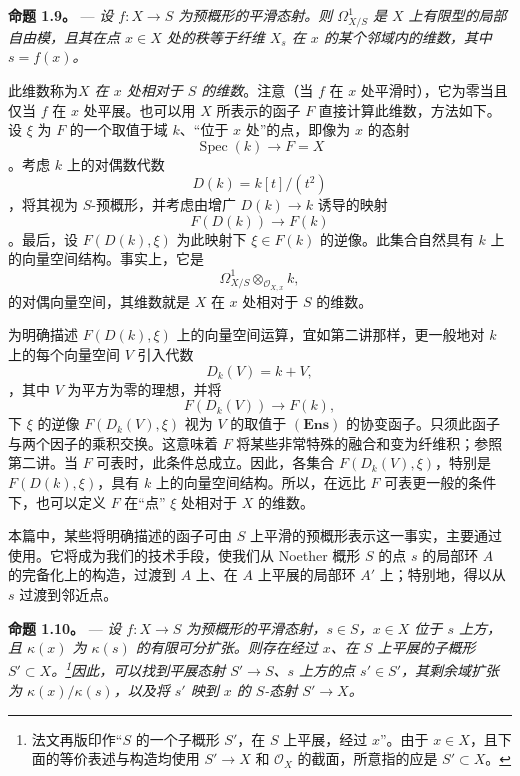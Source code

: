 
\medskip\noindent{}\textbf{命题 1.9。} --- \textit{设 \(f:X\to S\) 为预概形的平滑态射。则 \(\Omega^1_{X/S}\) 是 \(X\) 上有限型的局部自由模，且其在点 \(x\in X\) 处的秩等于纤维 \(X_s\) 在 \(x\) 的某个邻域内的维数，其中 \(s=f(x)\)。}

此维数称为\emph{\(X\) 在 \(x\) 处相对于 \(S\) 的维数}。注意（当 \(f\) 在 \(x\) 处平滑时），它为零当且仅当 \(f\) 在 \(x\) 处平展。也可以用 \(X\) 所表示的函子 \(F\) 直接计算此维数，方法如下。设 \(\xi\) 为 \(F\) 的一个取值于域 \(k\)、“位于 \(x\) 处”的点，即像为 \(x\) 的态射 \[
  \operatorname{Spec}(k)\longrightarrow F=X
\]。考虑 \(k\) 上的对偶数代数 \[
  D(k)=k[t]/(t^2)
\]，将其视为 \(S\)-预概形，并考虑由增广 \(D(k)\to k\) 诱导的映射  \[
  F(D(k))\longrightarrow F(k)
\]。最后，设 \(F(D(k),\xi)\) 为此映射下 \(\xi\in F(k)\) 的逆像。此集合自然具有 \(k\) 上的向量空间结构。事实上，它是 \[
  \Omega^1_{X/S}\otimes_{\mathscr O_{X,x}}k,
\] 的对偶向量空间，其维数就是 \(X\) 在 \(x\) 处相对于 \(S\) 的维数。

为明确描述 \(F(D(k),\xi)\) 上的向量空间运算，宜如第二讲那样，更一般地对 \(k\) 上的每个向量空间 \(V\) 引入代数 \[
  D_k(V)=k+V,
\]，其中 \(V\) 为平方为零的理想，并将 \[
  F(D_k(V))\longrightarrow F(k),
\] 下 \(\xi\) 的逆像 \(F(D_k(V),\xi)\) 视为 \(V\) 的取值于 \((\mathbf{Ens})\) 的协变函子。只须此函子与两个因子的乘积交换。这意味着 \(F\) 将某些非常特殊的融合和变为纤维积；参照第二讲。当 \(F\) 可表时，此条件总成立。因此，各集合 \(F(D_k(V),\xi)\)，特别是 \(F(D(k),\xi)\)，具有 \(k\) 上的向量空间结构。所以，在远比 \(F\) 可表更一般的条件下，也可以定义 \(F\) 在“点” \(\xi\) 处相对于 \(X\) 的维数。

本篇中，某些将明确描述的函子可由 \(S\) 上平滑的预概形表示这一事实，主要通过  使用。它将成为我们的技术手段，使我们从 Noether 概形 \(S\) 的点 \(s\) 的局部环 \(A\) 的完备化上的构造，过渡到 \(A\) 上、在 \(A\) 上平展的局部环 \(A'\) 上；特别地，得以从 \(s\) 过渡到邻近点。

\medskip\noindent{}\textbf{命题 1.10。} --- \textit{设 \(f:X\to S\) 为预概形的平滑态射，\(s\in S\)，\(x\in X\) 位于 \(s\) 上方，且 \(\kappa(x)\) 为 \(\kappa(s)\) 的有限可分扩张。则存在经过 \(x\)、在 \(S\) 上平展的子概形 \(S'\subset X\)。\footnote{法文再版印作“\(S\) 的一个子概形 \(S'\)，在 \(S\) 上平展，经过 \(x\)”。由于 \(x\in X\)，且下面的等价表述与构造均使用 \(S'\to X\) 和 \(\mathscr O_X\) 的截面，所意指的应是 \(S'\subset X\)。}因此，可以找到平展态射 \(S'\to S\)、\(s\) 上方的点 \(s'\in S'\)，其剩余域扩张为 \(\kappa(x)/\kappa(s)\)，以及将 \(s'\) 映到 \(x\) 的 \(S\)-态射 \(S'\to X\)。}

